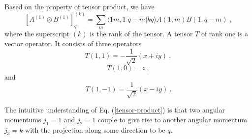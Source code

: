 Based on the property of tensor product, we have
\begin{equation}
\left[ A^{(1)} \otimes B^{(1)} \right]_{q}^{(k)} =\sum_{m} \langle 1m, 1\;q-m | kq \rangle A(1,m)B(1, q-m) \ , \label{tensor-product}
\end{equation}
where the superscript $(k)$ is the rank of the tensor. A tensor $T$ of rank one is a vector operator. It consists of three operators 
\begin{equation}
T(1,1) = - \frac{1}{\sqrt{2}} (x + i y) \ , \label{t11}
\end{equation}
\begin{equation}
T(1,0) = z \ , \label{t10}
\end{equation}
and 
\begin{equation}
T(1,-1) =  \frac{1}{\sqrt{2}} (x - i y) \ .  \label{t1-1}
\end{equation}

The intuitive understanding of Eq. (\ref{tensor-product}) is that two angular momentums $j_{1} =1$ and $j_{2}=1$ couple to give rise to another angular momentum $j_{3}=k$ with the projection along some direction to be $q$. 

